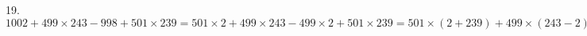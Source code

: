 19. $1002+499\times243-998+501\times239=501\times2+499\times243-499\times2+501\times239=501\times(2+239)+499\times(243-2)=501\times241+499\times241=
241\times(501+499)=241\times1000=241000.$\\
